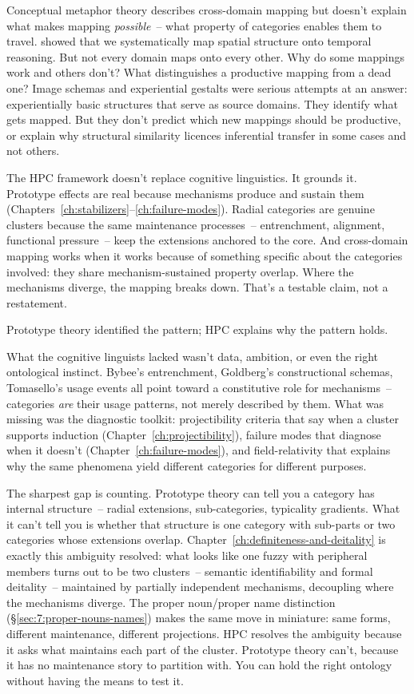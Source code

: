 Conceptual metaphor theory describes cross-domain mapping but doesn't explain what makes mapping \emph{possible}~-- what property of categories enables them to travel. \textcite{lakoff1980} showed that we systematically map spatial structure onto temporal reasoning. But not every domain maps onto every other. Why do some mappings work and others don't? What distinguishes a productive mapping from a dead one? Image schemas and experiential gestalts were serious attempts at an answer: experientially basic structures that serve as source domains. They identify what gets mapped. But they don't predict which new mappings should be productive, or explain why structural similarity licences inferential transfer in some cases and not others.

The HPC framework doesn't replace cognitive linguistics. It grounds it. Prototype effects are real because mechanisms produce and sustain them (Chapters~\ref{ch:stabilizers}--\ref{ch:failure-modes}). Radial categories are genuine clusters because the same maintenance processes~-- entrenchment, alignment, functional pressure~-- keep the extensions anchored to the core. And cross-domain mapping works when it works because of something specific about the categories involved: they share mechanism-sustained property overlap. Where the mechanisms diverge, the mapping breaks down. That's a testable claim, not a restatement.

Prototype theory identified the pattern; HPC explains why the pattern holds.

What the cognitive linguists lacked wasn't data, ambition, or even the right ontological instinct. Bybee's entrenchment, Goldberg's constructional schemas, Tomasello's usage events all point toward a constitutive role for mechanisms~-- categories \emph{are} their usage patterns, not merely described by them. What was missing was the diagnostic toolkit: projectibility criteria that say when a cluster supports induction (Chapter~\ref{ch:projectibility}), failure modes that diagnose when it doesn't (Chapter~\ref{ch:failure-modes}), and field-relativity that explains why the same phenomena yield different categories for different purposes.

The sharpest gap is counting. Prototype theory can tell you a category has internal structure~-- radial extensions, sub-categories, typicality gradients. What it can't tell you is whether that structure is one category with sub-parts or two categories whose extensions overlap. Chapter~\ref{ch:definiteness-and-deitality} is exactly this ambiguity resolved: what looks like one fuzzy  with peripheral members turns out to be two clusters~-- semantic identifiability and formal deitality~-- maintained by partially independent mechanisms, decoupling where the mechanisms diverge. The proper noun/proper name distinction (§\ref{sec:7:proper-nouns-names}) makes the same move in miniature: same forms, different maintenance, different projections. HPC resolves the ambiguity because it asks what maintains each part of the cluster. Prototype theory can't, because it has no maintenance story to partition with. You can hold the right ontology without having the means to test it.

